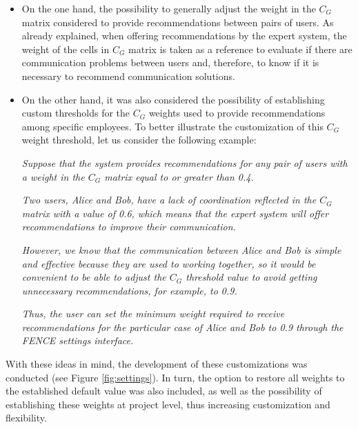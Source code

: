 \begin{itemize}
\item On the one hand, the possibility to generally adjust the weight in the $C_G$ matrix considered to provide recommendations between pairs of users. As already explained, when offering recommendations by the expert system, the weight of the cells in $C_G$ matrix is taken as a reference to evaluate if there are communication problems between users and, therefore, to know if it is necessary to recommend communication solutions.

\item On the other hand, it was also considered the possibility of establishing custom thresholds for the $C_G$ weights used to provide recommendations among specific employees. To better illustrate the customization of this $C_G$ weight threshold, let us consider the following example:\newline


\indent\emph{Suppose that the system provides recommendations for any pair of users with a weight in the $C_G$ matrix equal to or greater than 0.4.\newline}

\indent\emph{Two users, Alice and Bob, have a lack of coordination reflected in the $C_G$ matrix with a value of 0.6, which means that the expert system will offer recommendations to improve their communication.\newline}

\indent\emph{However, we know that the communication between Alice and Bob is simple and effective because they are used to working together, so it would be convenient to be able to adjust the $C_G$ threshold value to avoid getting unnecessary recommendations, for example, to 0.9.\newline}

\indent\emph{Thus, the user can set the minimum weight required to receive recommendations for the particular case of Alice and Bob to 0.9 through the FENCE settings interface.\newline}


\end{itemize}

With these ideas in mind, the development of these customizations was conducted (see Figure \ref{fig:settings}). In turn, the option to restore all weights to the established default value was also included, as well as the possibility of establishing these weights at project level, thus increasing customization and flexibility.

